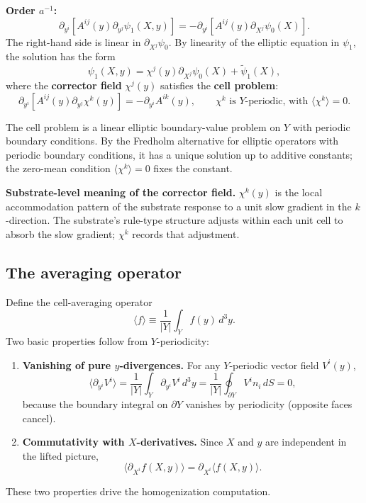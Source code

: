 \documentclass[11pt,a4paper]{article}
\begin{document}
\textbf{Order $a^{-1}$:}
\[
\partial_{y^i}\!\left[A^{ij}(y)\partial_{y^j}\psi_1(X, y)\right] = -\partial_{y^i}\!\left[A^{ij}(y)\partial_{X^j}\psi_0(X)\right].
\]
The right-hand side is linear in $\partial_{X^j}\psi_0$. By linearity of the elliptic equation in $\psi_1$, the solution has the form
\[
\psi_1(X, y) = \chi^j(y)\partial_{X^j}\psi_0(X) + \tilde\psi_1(X),
\]
where the \textbf{corrector field} $\chi^j(y)$ satisfies the \textbf{cell problem}:
\[
\boxed{\partial_{y^i}\!\left[A^{ij}(y)\partial_{y^j}\chi^k(y)\right] = -\partial_{y^i} A^{ik}(y), \qquad \chi^k \text{ is } Y\text{-periodic, with } \langle\chi^k\rangle = 0.}
\]

The cell problem is a linear elliptic boundary-value problem on $Y$ with periodic boundary conditions. By the Fredholm alternative for elliptic operators with periodic boundary conditions, it has a unique solution up to additive constants; the zero-mean condition $\langle\chi^k\rangle = 0$ fixes the constant.

\textbf{Substrate-level meaning of the corrector field.} $\chi^k(y)$ is the local accommodation pattern of the substrate response to a unit slow gradient in the $k$-direction. The substrate's rule-type structure adjusts within each unit cell to absorb the slow gradient; $\chi^k$ records that adjustment.

\subsection{The averaging operator}

Define the cell-averaging operator
\[
\langle f \rangle \equiv \frac{1}{|Y|}\int_Y f(y)\, d^3y.
\]
Two basic properties follow from $Y$-periodicity:

\begin{enumerate}[noitemsep]
\item \textbf{Vanishing of pure $y$-divergences.} For any $Y$-periodic vector field $V^i(y)$,
\[
\langle\partial_{y^i} V^i\rangle = \frac{1}{|Y|}\int_Y \partial_{y^i} V^i\, d^3y = \frac{1}{|Y|}\oint_{\partial Y} V^i n_i\, dS = 0,
\]
because the boundary integral on $\partial Y$ vanishes by periodicity (opposite faces cancel).
\item \textbf{Commutativity with $X$-derivatives.} Since $X$ and $y$ are independent in the lifted picture,
\[
\langle\partial_{X^i} f(X, y)\rangle = \partial_{X^i}\langle f(X, y)\rangle.
\]
\end{enumerate}

These two properties drive the homogenization computation.
\end{document}
